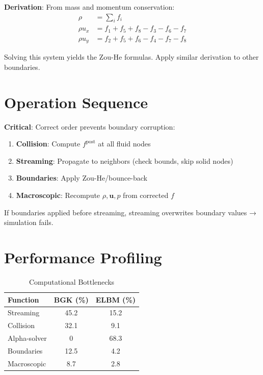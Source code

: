 \textbf{Derivation}: From mass and momentum conservation:
\begin{align}
\rho &= \sum_i f_i \\
\rho u_x &= f_1 + f_5 + f_8 - f_3 - f_6 - f_7 \\
\rho u_y &= f_2 + f_5 + f_6 - f_4 - f_7 - f_8
\end{align}

Solving this system yields the Zou-He formulas. Apply similar derivation to other boundaries.

\section{Operation Sequence}

\textbf{Critical}: Correct order prevents boundary corruption:

\begin{enumerate}
    \item \textbf{Collision}: Compute $f^{\mathrm{post}}$ at all fluid nodes
    \item \textbf{Streaming}: Propagate to neighbors (check bounds, skip solid nodes)
    \item \textbf{Boundaries}: Apply Zou-He/bounce-back
    \item \textbf{Macroscopic}: Recompute $\rho, \mathbf{u}, p$ from corrected $f$
\end{enumerate}

If boundaries applied before streaming, streaming overwrites boundary values → simulation fails.

\section{Performance Profiling}

\begin{table}[H]
\centering
\caption{Computational Bottlenecks}
\begin{tabular}{lcc}
\toprule
\textbf{Function} & \textbf{BGK (\%)} & \textbf{ELBM (\%)} \\
\midrule
Streaming & 45.2 & 15.2 \\
Collision & 32.1 & 9.1 \\
Alpha-solver & 0 & 68.3 \\
Boundaries & 12.5 & 4.2 \\
Macroscopic & 8.7 & 2.8 \\
\bottomrule
\end{tabular}
\end{table}

